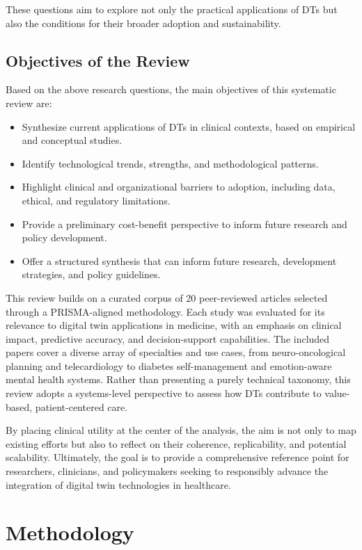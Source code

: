 \documentclass[10pt,a4paper]{article}
\begin{document}
These questions aim to explore not only the practical applications of DTs but also the conditions for their broader adoption and sustainability.

\subsection*{Objectives of the Review}
Based on the above research questions, the main objectives of this systematic review are:
\begin{itemize}
    \item Synthesize current applications of DTs in clinical contexts, based on empirical and conceptual studies.
    \item Identify technological trends, strengths, and methodological patterns.
    \item Highlight clinical and organizational barriers to adoption, including data, ethical, and regulatory limitations.
    \item Provide a preliminary cost-benefit perspective to inform future research and policy development.
    \item Offer a structured synthesis that can inform future research, development strategies, and policy guidelines.
\end{itemize}

This review builds on a curated corpus of 20 peer-reviewed articles selected through a PRISMA-aligned methodology. Each study was evaluated for its relevance to digital twin applications in medicine, with an emphasis on clinical impact, predictive accuracy, and decision-support capabilities. The included papers cover a diverse array of specialties and use cases, from neuro-oncological planning and telecardiology to diabetes self-management and emotion-aware mental health systems. Rather than presenting a purely technical taxonomy, this review adopts a systems-level perspective to assess how DTs contribute to value-based, patient-centered care.

By placing clinical utility at the center of the analysis, the aim is not only to map existing efforts but also to reflect on their coherence, replicability, and potential scalability. Ultimately, the goal is to provide a comprehensive reference point for researchers, clinicians, and policymakers seeking to responsibly advance the integration of digital twin technologies in healthcare.



\section{Methodology}
\end{document}
